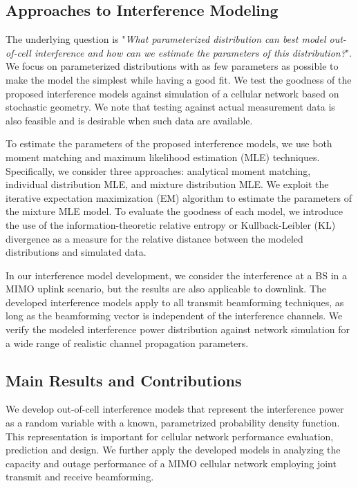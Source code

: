 \documentclass[12pt, draftclsnofoot, onecolumn]{IEEEtran}
\theoremstyle{plain}
\begin{document}
\subsection{Approaches to Interference Modeling}\vspace{-.1in}
The underlying question is "\textit{What parameterized distribution can best model out-of-cell interference and how can we estimate the parameters of this distribution?}". We focus on parameterized distributions with as few parameters as possible to make the model the simplest while having a good fit. 
We test the goodness of the proposed interference models against simulation of a cellular network based on stochastic geometry. We note that testing against actual measurement data is also feasible and is desirable when such data are available. 

To estimate the parameters of the proposed interference models, we use both moment matching and maximum likelihood estimation (MLE) techniques. 
Specifically, we consider three approaches: analytical moment matching, individual distribution MLE, and mixture distribution MLE. 
 We exploit the iterative expectation maximization (EM) algorithm to estimate the parameters of the mixture MLE model. To evaluate the goodness of each model, we introduce the use of the information-theoretic relative entropy or Kullback-Leibler (KL) divergence as a measure for the relative distance between the modeled distributions and simulated data. %

In our interference model development, we consider the interference at a {BS} in a MIMO uplink scenario, but the results are also applicable to downlink. 
The developed interference models apply to all transmit beamforming techniques, as long as the beamforming vector is independent of the interference channels.
We verify the modeled interference power distribution against network simulation for a wide range of realistic {channel} propagation parameters.
\vspace{-.2in}
\subsection{Main Results and Contributions}\vspace{-.1in}
We develop out-of-cell interference models that represent the interference power %
as a random variable with a known, parametrized probability density function. This representation is important for cellular network performance evaluation, prediction and design. We further apply the developed models in analyzing the capacity and outage performance of a MIMO cellular network employing joint transmit and receive beamforming. 
\end{document}
